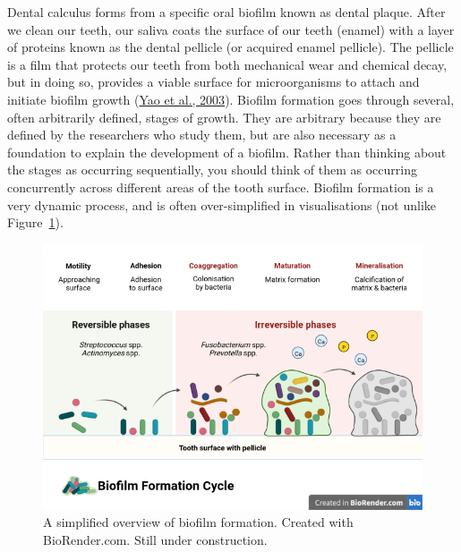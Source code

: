 \documentclass[
  letterpaper,
]{book}
\begin{document}
Dental calculus forms from a specific oral biofilm known as dental
plaque. After we clean our teeth, our saliva coats the surface of our
teeth (enamel) with a layer of proteins known as the dental pellicle (or
acquired enamel pellicle). The pellicle is a film that protects our
teeth from both mechanical wear and chemical decay, but in doing so,
provides a viable surface for microorganisms to attach and initiate
biofilm growth (\protect\hyperlink{ref-yaoIdentificationProtein2003}{Yao
et al., 2003}). Biofilm formation goes through several, often
arbitrarily defined, stages of growth. They are arbitrary because they
are defined by the researchers who study them, but are also necessary as
a foundation to explain the development of a biofilm. Rather than
thinking about the stages as occurring sequentially, you should think of
them as occurring concurrently across different areas of the tooth
surface. Biofilm formation is a very dynamic process, and is often
over-simplified in visualisations (not unlike
Figure~\ref{fig-biofilm-form}).

\begin{figure}

{\centering \includegraphics{./figures/biofilm_formation.png}

}

\caption{\label{fig-biofilm-form}A simplified overview of biofilm
formation. Created with BioRender.com. Still under construction.}

\end{figure}
\end{document}
